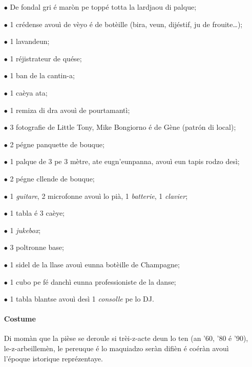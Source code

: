 \Scenographie
\begin{itemize}
\item[$\bullet$] De fondal gri é maròn pe toppé totta la lardjaou di palque;
\item[$\bullet$] 1 crédense avouì de vèyo é de botèille (bira, veun, dijéstif, ju de frouite\ldots);
\item[$\bullet$] 1 lavandeun;
\item[$\bullet$] 1 réjistrateur de quése;
\item[$\bullet$] 1 ban de la cantin-a;
\item[$\bullet$] 1 caèya ata;
\item[$\bullet$] 1 remiza di dra avouì de pourtamantì;
\item[$\bullet$] 3 fotografie de Little Tony, Mike Bongiorno é de Gène (patr\'on di local);
\item[$\bullet$] 2 pégne panquette de bouque;
\item[$\bullet$] 1 palque de 3 pe 3 mètre, ate eugn'eunpanna, avouì eun tapis rodzo desì;
\item[$\bullet$] 2 pégne cllende de bouque;
\item[$\bullet$] 1 \textit{guitare}, 2 microfonne avouì lo pià, 1 \textit{batterie}, 1 \textit{clavier};
\item[$\bullet$] 1 tabla é 3 caèye;
\item[$\bullet$] 1 \textit{jukebox};
\item[$\bullet$] 3 poltronne base;
\item[$\bullet$] 1 sidel de la llase avouì eunna botèille de Champagne;
\item[$\bullet$] 1 cubo pe fé danchì eunna professioniste de la danse;
\item[$\bullet$] 1 tabla blantse avouì desì 1 \textit{consolle} pe lo DJ. 

\paragraph*{Costume} Di momàn que la pièse se deroule si trèi-z-acte deun lo ten (an '60, '80 é '90), le-z-arbeillemèn, le pereuque é lo maquiadzo seràn difièn é coéràn avouì l'époque istorique reprézentaye.

\end{itemize}

\setlength{\lengthchar}{3.125cm}


